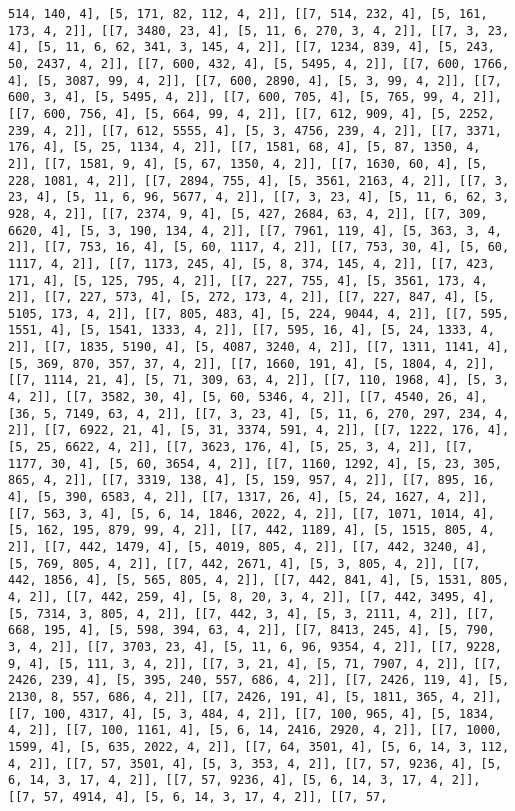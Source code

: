 \documentclass[12pt,fleqn]{article}\usepackage{../../common}
\begin{document}
\begin{verbatim}
514, 140, 4], [5, 171, 82, 112, 4, 2]], [[7, 514, 232, 4], [5, 161, 173, 4, 2]], [[7, 3480, 23, 4], [5, 11, 6, 270, 3, 4, 2]], [[7, 3, 23, 4], [5, 11, 6, 62, 341, 3, 145, 4, 2]], [[7, 1234, 839, 4], [5, 243, 50, 2437, 4, 2]], [[7, 600, 432, 4], [5, 5495, 4, 2]], [[7, 600, 1766, 4], [5, 3087, 99, 4, 2]], [[7, 600, 2890, 4], [5, 3, 99, 4, 2]], [[7, 600, 3, 4], [5, 5495, 4, 2]], [[7, 600, 705, 4], [5, 765, 99, 4, 2]], [[7, 600, 756, 4], [5, 664, 99, 4, 2]], [[7, 612, 909, 4], [5, 2252, 239, 4, 2]], [[7, 612, 5555, 4], [5, 3, 4756, 239, 4, 2]], [[7, 3371, 176, 4], [5, 25, 1134, 4, 2]], [[7, 1581, 68, 4], [5, 87, 1350, 4, 2]], [[7, 1581, 9, 4], [5, 67, 1350, 4, 2]], [[7, 1630, 60, 4], [5, 228, 1081, 4, 2]], [[7, 2894, 755, 4], [5, 3561, 2163, 4, 2]], [[7, 3, 23, 4], [5, 11, 6, 96, 5677, 4, 2]], [[7, 3, 23, 4], [5, 11, 6, 62, 3, 928, 4, 2]], [[7, 2374, 9, 4], [5, 427, 2684, 63, 4, 2]], [[7, 309, 6620, 4], [5, 3, 190, 134, 4, 2]], [[7, 7961, 119, 4], [5, 363, 3, 4, 2]], [[7, 753, 16, 4], [5, 60, 1117, 4, 2]], [[7, 753, 30, 4], [5, 60, 1117, 4, 2]], [[7, 1173, 245, 4], [5, 8, 374, 145, 4, 2]], [[7, 423, 171, 4], [5, 125, 795, 4, 2]], [[7, 227, 755, 4], [5, 3561, 173, 4, 2]], [[7, 227, 573, 4], [5, 272, 173, 4, 2]], [[7, 227, 847, 4], [5, 5105, 173, 4, 2]], [[7, 805, 483, 4], [5, 224, 9044, 4, 2]], [[7, 595, 1551, 4], [5, 1541, 1333, 4, 2]], [[7, 595, 16, 4], [5, 24, 1333, 4, 2]], [[7, 1835, 5190, 4], [5, 4087, 3240, 4, 2]], [[7, 1311, 1141, 4], [5, 369, 870, 357, 37, 4, 2]], [[7, 1660, 191, 4], [5, 1804, 4, 2]], [[7, 1114, 21, 4], [5, 71, 309, 63, 4, 2]], [[7, 110, 1968, 4], [5, 3, 4, 2]], [[7, 3582, 30, 4], [5, 60, 5346, 4, 2]], [[7, 4540, 26, 4], [36, 5, 7149, 63, 4, 2]], [[7, 3, 23, 4], [5, 11, 6, 270, 297, 234, 4, 2]], [[7, 6922, 21, 4], [5, 31, 3374, 591, 4, 2]], [[7, 1222, 176, 4], [5, 25, 6622, 4, 2]], [[7, 3623, 176, 4], [5, 25, 3, 4, 2]], [[7, 1177, 30, 4], [5, 60, 3654, 4, 2]], [[7, 1160, 1292, 4], [5, 23, 305, 865, 4, 2]], [[7, 3319, 138, 4], [5, 159, 957, 4, 2]], [[7, 895, 16, 4], [5, 390, 6583, 4, 2]], [[7, 1317, 26, 4], [5, 24, 1627, 4, 2]], [[7, 563, 3, 4], [5, 6, 14, 1846, 2022, 4, 2]], [[7, 1071, 1014, 4], [5, 162, 195, 879, 99, 4, 2]], [[7, 442, 1189, 4], [5, 1515, 805, 4, 2]], [[7, 442, 1479, 4], [5, 4019, 805, 4, 2]], [[7, 442, 3240, 4], [5, 769, 805, 4, 2]], [[7, 442, 2671, 4], [5, 3, 805, 4, 2]], [[7, 442, 1856, 4], [5, 565, 805, 4, 2]], [[7, 442, 841, 4], [5, 1531, 805, 4, 2]], [[7, 442, 259, 4], [5, 8, 20, 3, 4, 2]], [[7, 442, 3495, 4], [5, 7314, 3, 805, 4, 2]], [[7, 442, 3, 4], [5, 3, 2111, 4, 2]], [[7, 668, 195, 4], [5, 598, 394, 63, 4, 2]], [[7, 8413, 245, 4], [5, 790, 3, 4, 2]], [[7, 3703, 23, 4], [5, 11, 6, 96, 9354, 4, 2]], [[7, 9228, 9, 4], [5, 111, 3, 4, 2]], [[7, 3, 21, 4], [5, 71, 7907, 4, 2]], [[7, 2426, 239, 4], [5, 395, 240, 557, 686, 4, 2]], [[7, 2426, 119, 4], [5, 2130, 8, 557, 686, 4, 2]], [[7, 2426, 191, 4], [5, 1811, 365, 4, 2]], [[7, 100, 4317, 4], [5, 3, 484, 4, 2]], [[7, 100, 965, 4], [5, 1834, 4, 2]], [[7, 100, 1161, 4], [5, 6, 14, 2416, 2920, 4, 2]], [[7, 1000, 1599, 4], [5, 635, 2022, 4, 2]], [[7, 64, 3501, 4], [5, 6, 14, 3, 112, 4, 2]], [[7, 57, 3501, 4], [5, 3, 353, 4, 2]], [[7, 57, 9236, 4], [5, 6, 14, 3, 17, 4, 2]], [[7, 57, 9236, 4], [5, 6, 14, 3, 17, 4, 2]], [[7, 57, 4914, 4], [5, 6, 14, 3, 17, 4, 2]], [[7, 57, 
\end{verbatim}
\end{document}
